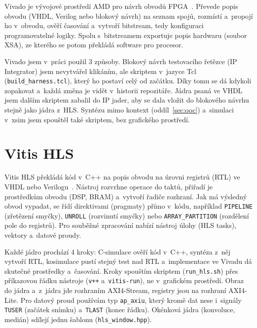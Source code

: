 Vivado je vývojové prostředí AMD pro návrh obvodů FPGA~\cite{amd_vivado}. Převede popis obvodu (VHDL, Verilog nebo blokový návrh) na seznam spojů, rozmístí a~propojí ho v~obvodu, ověří časování a~vytvoří bitstream, tedy konfiguraci programovatelné logiky. Spolu s~bitstreamem exportuje popis hardwaru (soubor XSA), ze kterého se potom překládá software pro procesor.

Vivado jsem v~práci použil 3 způsoby. Blokový návrh testovacího řetězce (IP Integrator) jsem nevytvářel klikáním, ale skriptem v~jazyce Tcl (\texttt{build\_harness.tcl}), který ho postaví celý od začátku. Díky tomu se dá kdykoli zopakovat a~každá změna je vidět v~historii repozitáře. Jádra psaná ve VHDL jsem dalším skriptem zabalil do IP jader, aby se dala vložit do blokového návrhu stejně jako jádra z~HLS. Syntézu mimo kontext (oddíl~\ref{sec:ooc}) a~simulaci v~xsim jsem spouštěl také skriptem, bez grafického prostředí.

\section{Vitis HLS}
\label{sec:vitis-hls}

Vitis HLS překládá kód v~C++ na popis obvodu na úrovni registrů (\ac{RTL}) ve VHDL nebo Verilogu~\cite{amd_vitis}. Nástroj rozvrhne operace do taktů, přiřadí je prostředkům obvodu (DSP, BRAM) a~vytvoří řadiče rozhraní. Jak má výsledný obvod vypadat, se řídí direktivami (pragmaty) přímo v~kódu, například \texttt{PIPELINE} (zřetězení smyčky), \texttt{UNROLL} (rozvinutí smyčky) nebo \texttt{ARRAY\_PARTITION} (rozdělení pole do registrů). Pro souběžné zpracování nabízí nástroj úlohy (HLS tasks), vektory a~datové proudy.


Každé jádro prochází 4 kroky: C-simulace ověří kód v~C++, syntéza z~něj vytvoří RTL, kosimulace pustí stejný test nad RTL a~implementace ve Vivadu dá skutečné prostředky a~časování. Kroky spouštím skriptem (\texttt{run\_hls.sh}) přes příkazovou řádku nástroje (\texttt{v++} a~\texttt{vitis-run}), ne v~grafickém prostředí. Obraz do jádra a~z~jádra jde rozhraním AXI4-Stream, registry jsou na rozhraní AXI4-Lite. Pro datový proud používám typ \texttt{ap\_axiu}, který kromě dat nese i~signály \texttt{TUSER} (začátek snímku) a~\texttt{TLAST} (konec řádku). Okénková jádra (konvoluce, medián) sdílejí jednu šablonu (\texttt{hls\_window.hpp}).

